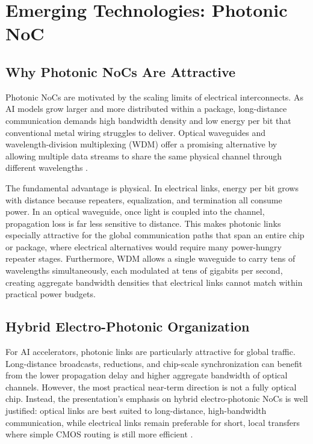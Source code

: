 \section{Emerging Technologies: Photonic NoC}
\label{sec:photonic}

\subsection{Why Photonic NoCs Are Attractive}

Photonic NoCs are motivated by the scaling limits of electrical interconnects. As AI models grow larger and more distributed within a package, long-distance communication demands high bandwidth density and low energy per bit that conventional metal wiring struggles to deliver. Optical waveguides and wavelength-division multiplexing (WDM) offer a promising alternative by allowing multiple data streams to share the same physical channel through different wavelengths \cite{vantrease2008corona,pan2009firefly}.

The fundamental advantage is physical. In electrical links, energy per bit grows with distance because repeaters, equalization, and termination all consume power. In an optical waveguide, once light is coupled into the channel, propagation loss is far less sensitive to distance. This makes photonic links especially attractive for the global communication paths that span an entire chip or package, where electrical alternatives would require many power-hungry repeater stages. Furthermore, WDM allows a single waveguide to carry tens of wavelengths simultaneously, each modulated at tens of gigabits per second, creating aggregate bandwidth densities that electrical links cannot match within practical power budgets.

\subsection{Hybrid Electro-Photonic Organization}

For AI accelerators, photonic links are particularly attractive for global traffic. Long-distance broadcasts, reductions, and chip-scale synchronization can benefit from the lower propagation delay and higher aggregate bandwidth of optical channels. However, the most practical near-term direction is not a fully optical chip. Instead, the presentation's emphasis on hybrid electro-photonic NoCs is well justified: optical links are best suited to long-distance, high-bandwidth communication, while electrical links remain preferable for short, local transfers where simple CMOS routing is still more efficient \cite{pasricha2022electronic,weerasena2024security}.

